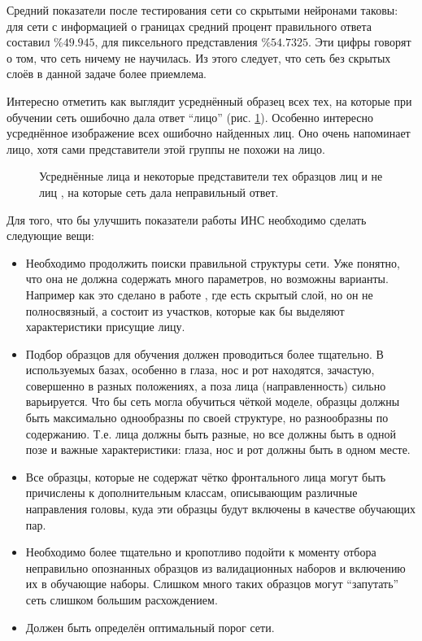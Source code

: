 \documentclass[12pt]{report}
\newenvironment{myItemize}{
 	\vspace{-10pt}
	\begin{itemize}[nolistsep]
}{\end{itemize}}
\begin{document}
Средний показатели после тестирования сети со скрытыми нейронами таковы: для сети с информацией о границах средний 
процент правильного ответа составил $\%49.945$, для пиксельного представления $\%54.7325$. Эти цифры говорят о том, 
что сеть ничему не научилась. Из этого следует, что сеть без скрытых слоёв в данной задаче более приемлема.

Интересно отметить как выглядит усреднённый образец всех тех, на которые при обучении сеть ошибочно дала ответ 
``лицо'' (рис. \ref{fig:false_avg}). Особенно интересно усреднённое изображение всех ошибочно найденных лиц. Оно 
очень напоминает лицо, хотя сами представители этой группы не похожи на лицо. 

\begin{figure}[h]
	\centering
	\hspace{1cm}
	\caption{Усреднённые лица и некоторые представители тех образцов лиц  и не лиц 
, на которые сеть дала неправильный ответ.}
	\label{fig:false_avg}
\end{figure}

Для того, что бы улучшить показатели работы ИНС необходимо сделать следующие вещи:
\begin{myItemize}
\item Необходимо продолжить поиски правильной структуры сети. Уже понятно, что она не должна содержать много 
параметров, но возможны варианты. Например как это сделано в работе \citep{rowley1998neural}, где есть скрытый 
слой, 
но он не полносвязный, а состоит из участков, которые как бы выделяют характеристики присущие лицу.
\item Подбор образцов для обучения должен проводиться более тщательно. В используемых базах, особенно в \citep
{huang2007labeled} глаза, нос и рот находятся, зачастую, совершенно в разных положениях, а поза лица (направленность) сильно 
варьируется. Что бы сеть могла обучиться чёткой моделе, образцы должны быть максимально однообразны по своей 
структуре, но разнообразны по содержанию. Т.е. лица должны быть разные, но все должны быть в одной позе и важные 
характеристики: глаза, нос и рот должны быть в одном месте.
\item Все образцы, которые не содержат чётко фронтального лица могут быть причислены к дополнительным классам, 
описывающим различные направления головы, куда эти образцы будут включены в качестве обучающих пар.
\item Необходимо более тщательно и кропотливо подойти к моменту отбора неправильно опознанных образцов из 
валидационных наборов и включению их в обучающие наборы. Слишком много таких образцов могут ``запутать'' сеть 
слишком большим расхождением.
\item Должен быть определён оптимальный порог сети.%
\end{myItemize}
\end{document}
